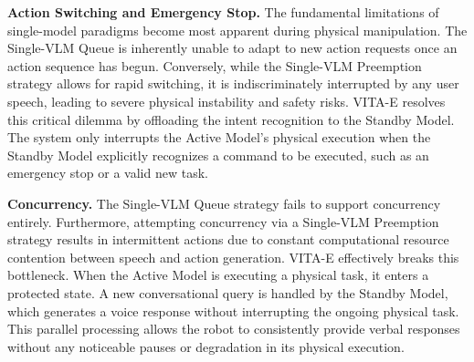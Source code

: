 \textbf{Action Switching and Emergency Stop.} The fundamental limitations of single-model paradigms become most apparent during physical manipulation. The Single-VLM Queue is inherently unable to adapt to new action requests once an action sequence has begun. Conversely, while the Single-VLM Preemption strategy allows for rapid switching, it is indiscriminately interrupted by any user speech, leading to severe physical instability and safety risks. VITA-E resolves this critical dilemma by offloading the intent recognition to the Standby Model. The system only interrupts the Active Model's physical execution when the Standby Model explicitly recognizes a command to be executed, such as an emergency stop or a valid new task.

\textbf{Concurrency.} The Single-VLM Queue strategy fails to support concurrency entirely. Furthermore, attempting concurrency via a Single-VLM Preemption strategy results in intermittent actions due to constant computational resource contention between speech and action generation. VITA-E effectively breaks this bottleneck. When the Active Model is executing a physical task, it enters a protected state. A new conversational query is handled by the Standby Model, which generates a voice response without interrupting the ongoing physical task. This parallel processing allows the robot to consistently provide verbal responses without any noticeable pauses or degradation in its physical execution.

\begin{table}[htbp]
    \vspace{-1.5em}
    \centering
    \caption{Performance Comparison in Interruption and Concurrency Scenarios}
    \label{tab:scenario_comparison}
    \vspace{-2em}
\end{table}

